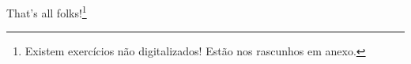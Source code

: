 \documentclass[a4paper]{article}
\newtheorem{theorem}{Theorem}[section]
\newenvironment{proof}[1][Proof]{\begin{trivlist}
\item[\hskip \labelsep {\bfseries #1}]}{\end{trivlist}}
\begin{document}
%
%
%
%
%
{\small That's all folks!}\footnote{Existem exercícios não digitalizados! Estão nos rascunhos em anexo.}
\end{document}
